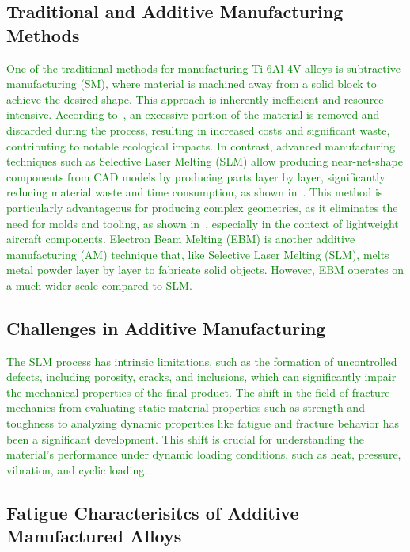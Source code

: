 \documentclass[preprint,12pt]{elsarticle}
\begin{document}
\subsection{Traditional and Additive Manufacturing Methods}
\textcolor{green}{One of the traditional methods for manufacturing Ti-6Al-4V alloys is subtractive manufacturing (SM), where material is machined away from a solid block to achieve the desired shape. This approach is inherently inefficient and resource-intensive. According to~\cite{peng2017toward}, an excessive portion of the material is removed and discarded during the process, resulting in increased costs and significant waste, contributing to notable ecological impacts.
In contrast, advanced manufacturing techniques such as Selective Laser Melting (SLM) allow producing near-net-shape components from CAD models by producing parts layer by layer, significantly reducing material waste and time consumption, as shown in~\cite{fatimah2013sustainable}. This method is particularly advantageous for producing complex geometries, as it eliminates the need for molds and tooling, as shown in~\cite{huang2016energy}, especially in the context of lightweight aircraft components.
Electron Beam Melting (EBM) is another additive manufacturing (AM) technique that, like Selective Laser Melting (SLM), melts metal powder layer by layer to fabricate solid objects.
However, EBM operates on a much wider scale compared to SLM.}

\subsection{Challenges in Additive Manufacturing}
\textcolor{green}{

The SLM process has intrinsic limitations, such as the formation of uncontrolled defects, including porosity, cracks, and inclusions, which can significantly impair the mechanical properties of the final product. The shift in the field of fracture mechanics from evaluating static material properties such as strength and toughness to analyzing dynamic properties like fatigue and fracture behavior has been a significant development. This shift is crucial for understanding the material's performance under dynamic loading conditions, such as heat, pressure, vibration, and cyclic loading.}


\subsection{Fatigue Characterisitcs of Additive Manufactured Alloys}
\end{document}

